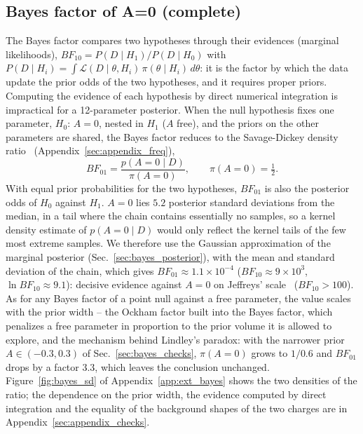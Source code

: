 \subsection{Bayes factor of A=0 (complete)}
The Bayes factor compares two hypotheses through their evidences (marginal likelihoods), $BF_{10}=P(D\mid H_1)/P(D\mid H_0)$ with $P(D\mid H_i)=\int\mathcal{L}(D\mid\theta,H_i)\,\pi(\theta\mid H_i)\,d\theta$: it is the factor by which the data update the prior odds of the two hypotheses, and it requires proper priors. Computing the evidence of each hypothesis by direct numerical integration is impractical for a 12-parameter posterior. When the null hypothesis fixes one parameter, $H_0$: $A=0$, nested in $H_1$ ($A$ free), and the priors on the other parameters are shared, the Bayes factor reduces to the Savage-Dickey density ratio~\cite{dickey1971} (Appendix~\ref{sec:appendix_freq}),
\[
BF_{01} = \frac{p(A=0\mid D)}{\pi(A=0)}, \qquad \pi(A=0)=\tfrac12 .
\]
With equal prior probabilities for the two hypotheses, $BF_{01}$ is also the posterior odds of $H_0$ against $H_1$. $A=0$ lies $5.2$ posterior standard deviations from the median, in a tail where the chain contains essentially no samples, so a kernel density estimate of $p(A=0\mid D)$ would only reflect the kernel tails of the few most extreme samples. We therefore use the Gaussian approximation of the marginal posterior (Sec.~\ref{sec:bayes_posterior}), with the mean and standard deviation of the chain, which gives $BF_{01}\approx1.1\times10^{-4}$ ($BF_{10}\approx9\times10^{3}$, $\ln BF_{10}\approx9.1$): decisive evidence against $A=0$ on Jeffreys' scale~\cite{jeffreys} ($BF_{10}>100$). As for any Bayes factor of a point null against a free parameter, the value scales with the prior width -- the Ockham factor built into the Bayes factor, which penalizes a free parameter in proportion to the prior volume it is allowed to explore, and the mechanism behind Lindley's paradox: with the narrower prior $A\in(-0.3,0.3)$ of Sec.~\ref{sec:bayes_checks}, $\pi(A=0)$ grows to $1/0.6$ and $BF_{01}$ drops by a factor $3.3$, which leaves the conclusion unchanged. Figure~\ref{fig:bayes_sd} of Appendix~\ref{app:ext_bayes} shows the two densities of the ratio; the dependence on the prior width, the evidence computed by direct integration and the equality of the background shapes of the two charges are in Appendix~\ref{sec:appendix_checks}.

